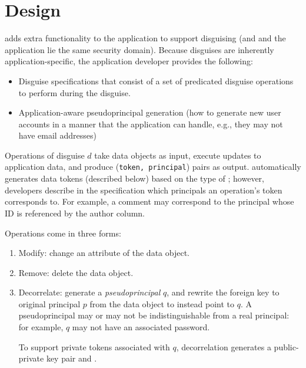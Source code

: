 \section{Design} 

\sys adds extra functionality to the application to support disguising (and \sys and the application lie the same security domain).
%
Because disguises are inherently application-specific, the application developer provides the following:
\begin{itemize}
    \item Disguise specifications that consist of a set of predicated disguise operations to
        perform during the disguise.
    \item Application-aware pseudoprincipal generation (how to generate new user accounts in a
        manner that the application can handle, e.g., they may not have email addresses)
\end{itemize}

\vspace{-6pt}
Operations  of disguise $d$ take data objects as input, execute updates to application data,
and produce (\texttt{token, principal}) pairs as output. \sys automatically generates data tokens
(described below) based on the type of ; however, developers describe in the specification
which principals an operation's token corresponds to. For example, a comment may correspond to the
principal whose ID is referenced by the author column.  

\vspace{6pt}\noindent
Operations come in three forms:
\begin{enumerate}
    \item Modify: change an attribute of the data object.
    \item Remove: delete the data object.
    \item Decorrelate: generate a \emph{pseudoprincipal} $q$, and rewrite the foreign key to original
        principal $p$ from the data object to instead point to $q$.
        A pseudoprincipal may or may not be indistinguishable from a real principal: for example,
        $q$ may not have an associated password.

        To support private tokens associated with $q$, decorrelation generates a
        public-private key pair  and .
\end{enumerate}

